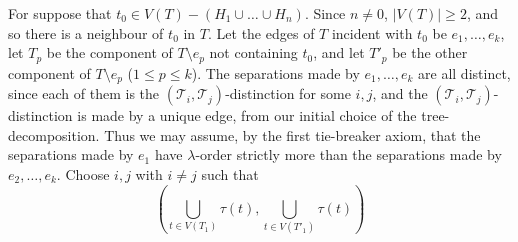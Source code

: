 For suppose that $t_0 \in V(T) - (H_1 \cup \dots \cup H_n)$. Since $n \ne 0$, $|V(T)| \ge 2$, and so there is a neighbour of $t_0$ in $T$. Let the edges of $T$ incident with $t_0$ be $e_1, \dots, e_k$, let $T_p$ be the component of $T \setminus e_p$ not containing $t_0$, and let $T'_p$ be the other component of $T \setminus e_p$ ($1 \le p \le k$). The separations made by $e_1, \dots, e_k$ are all distinct, since each of them is the $(\mathscr{T}_i, \mathscr{T}_j)$-distinction for some $i, j$, and the $(\mathscr{T}_i, \mathscr{T}_j)$-distinction is made by a unique edge, from our initial choice of the tree-decomposition. Thus we may assume, by the first tie-breaker axiom, that the separations made by $e_1$ have $\lambda$-order strictly more than the separations made by $e_2, \dots, e_k$. Choose $i, j$ with $i \ne j$ such that
\begin{equation*}
\left( \bigcup_{t \in V(T_1)} \tau(t), \bigcup_{t \in V(T'_1)} \tau(t) \right)
\end{equation*}
